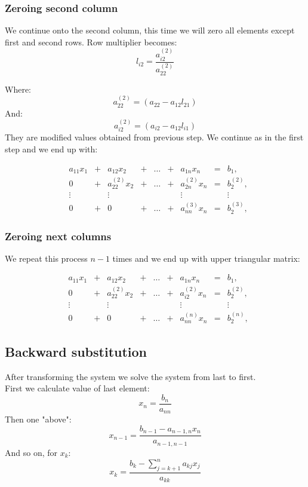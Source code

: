 \documentclass{report}
\begin{document}
\subsubsection{Zeroing second column}
We continue onto the second column, this time we will zero all elements except first and second rows.
Row multiplier becomes:
\[ l_{i2} = \frac{ a_{i2}^{(2)} }{ a_{22}^{(2)} } \]

Where:
\[ a_{22}^{(2)} = (a_{22} - a_{12}l_{21}) \]
And:
\[ a_{i2}^{(2)} = (a_{i2} - a_{12}l_{i1}) \]
They are modified values obtained from previous step.
We continue as in the first step and we end up with:

\[
\begin{matrix}

&a_{11}x_1 &{}+&a_{12}x_2&+&\dots&+&a_{1n}x_n &=&b_1,\\

&0 &{}+& a_{22}^{(2)}x_2&{}+&\dots&{}+& a_{2n}^{(2)}x_n &=&b_2^{(2)},\\

&\vdots    &&\vdots      & &     & &  \vdots  & &\vdots\\

&0 &{}+& 0 &{}+&\dots&{}+& a_{nn}^{(3)}x_n &=&b_2^{(3)},

\end{matrix}
\]

\subsubsection{Zeroing next columns}
We repeat this process $n-1$ times and we end up with upper triangular matrix:

\[
\begin{matrix}

&a_{11}x_1 &{}+&a_{12}x_2&+&\dots&+&a_{1n}x_n &=&b_1,\\

&0 &{}+& a_{22}^{(2)}x_2&{}+&\dots&{}+& a_{i2}^{(2)}x_n &=&b_2^{(2)},\\

&\vdots    &&\vdots      & &     & &  \vdots  & &\vdots\\

&0 &{}+& 0 &{}+&\dots&{}+& a_{nn}^{(n)}x_n &=&b_2^{(n)},

\end{matrix}
\]

\subsection{Backward substitution}
After transforming the system we solve the system from last to first. \\
First we calculate value of last element:
\[ x_n = \frac{b_n}{a_{nn}} \]
Then one "above":
\[ x_{n-1} = \frac{ b_{n-1} - a_{n-1, n}x_n}{a_{n-1, n-1}} \]
And so on, for $x_k$:
\[ x_{k} = \frac{b_k - \sum_{j = k + 1}^n a_{kj}x_j}{a_{kk}} \]
\end{document}
